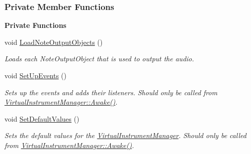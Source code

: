 \subsubsection*{Private Member Functions}
\begin{Indent}\textbf{ Private Functions}\par
\begin{DoxyCompactItemize}
\item 
void \hyperlink{group___virtual_instrument_manager_a8817e32cc5074737b4d9489922b0fcb8}{Load\+Note\+Output\+Objects} ()
\begin{DoxyCompactList}\small\item\em Loads each Note\+Output\+Object that is used to output the audio. \end{DoxyCompactList}\item 
\mbox{\label{group___virtual_instrument_manager_aa207d18111d38374017c580de4077589}} 
void \hyperlink{group___virtual_instrument_manager_aa207d18111d38374017c580de4077589}{Set\+Up\+Events} ()
\begin{DoxyCompactList}\small\item\em Sets up the events and adds their listeners. Should only be called from \hyperlink{group___virtual_instrument_manager_ab92bac4e22476ffe39fc40f49fbd6ae5}{Virtual\+Instrument\+Manager\+::\+Awake()}. \end{DoxyCompactList}\item 
\mbox{\label{group___virtual_instrument_manager_aa9e05e51f025afb0ab5cb2a8532c8bba}} 
void \hyperlink{group___virtual_instrument_manager_aa9e05e51f025afb0ab5cb2a8532c8bba}{Set\+Default\+Values} ()
\begin{DoxyCompactList}\small\item\em Sets the default values for the \hyperlink{group___virtual_instrument_manager_class_virtual_instrument_manager}{Virtual\+Instrument\+Manager}. Should only be called from \hyperlink{group___virtual_instrument_manager_ab92bac4e22476ffe39fc40f49fbd6ae5}{Virtual\+Instrument\+Manager\+::\+Awake()}. \end{DoxyCompactList}\end{DoxyCompactItemize}
\end{Indent}

